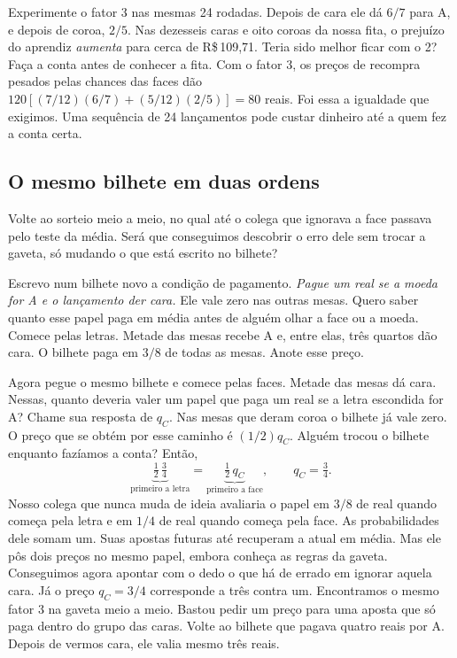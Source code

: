 \documentclass[12pt,oneside]{article}
\newcommand{\secao}[1]{\Needspace{5.2\baselineskip}\subsection*{#1}}
\begin{document}
Experimente o fator 3 nas mesmas 24 rodadas. Depois de cara ele dá $6/7$ para A, e depois de coroa, $2/5$. Nas dezesseis caras e oito coroas da nossa fita, o prejuízo do aprendiz \emph{aumenta} para cerca de R\$\,109,71. Teria sido melhor ficar com o 2? Faça a conta antes de conhecer a fita. Com o fator 3, os preços de recompra pesados pelas chances das faces dão $120[(7/12)(6/7)+(5/12)(2/5)]=80$ reais. Foi essa a igualdade que exigimos. Uma sequência de 24 lançamentos pode custar dinheiro até a quem fez a conta certa.

\secao{O mesmo bilhete em duas ordens}
Volte ao sorteio meio a meio, no qual até o colega que ignorava a face passava pelo teste da média. Será que conseguimos descobrir o erro dele sem trocar a gaveta, só mudando o que está escrito no bilhete?

Escrevo num bilhete novo a condição de pagamento. \emph{Pague um real se a moeda for A e o lançamento der cara.} Ele vale zero nas outras mesas. Quero saber quanto esse papel paga em média antes de alguém olhar a face ou a moeda. Comece pelas letras. Metade das mesas recebe A e, entre elas, três quartos dão cara. O bilhete paga em $3/8$ de todas as mesas. Anote esse preço.

Agora pegue o mesmo bilhete e comece pelas faces. Metade das mesas dá cara. Nessas, quanto deveria valer um papel que paga um real se a letra escondida for A? Chame sua resposta de $q_C$. Nas mesas que deram coroa o bilhete já vale zero. O preço que se obtém por esse caminho é $(1/2)q_C$. Alguém trocou o bilhete enquanto fazíamos a conta? Então,
\[
       \underbrace{\tfrac12\,\tfrac34}_{\text{primeiro a letra}}
       =\underbrace{\tfrac12\,q_C}_{\text{primeiro a face}},
       \qquad q_C=\tfrac34 .
\]
Nosso colega que nunca muda de ideia avaliaria o papel em $3/8$ de real quando começa pela letra e em $1/4$ de real quando começa pela face. As probabilidades dele somam um. Suas apostas futuras até recuperam a atual em média. Mas ele pôs dois preços no mesmo papel, embora conheça as regras da gaveta. Conseguimos agora apontar com o dedo o que há de errado em ignorar aquela cara. Já o preço $q_C=3/4$ corresponde a três contra um. Encontramos o mesmo fator 3 na gaveta meio a meio. Bastou pedir um preço para uma aposta que só paga dentro do grupo das caras. Volte ao bilhete que pagava quatro reais por A. Depois de vermos cara, ele valia mesmo três reais.
\end{document}
